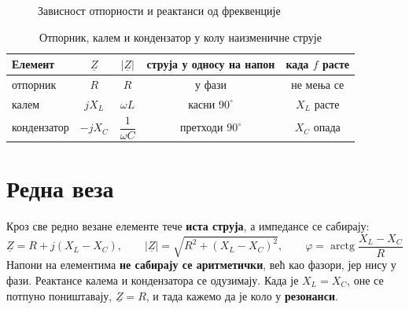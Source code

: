 \documentclass{article}
\begin{document}
\begin{figure}[H]
    \centering
    \caption{Зависност отпорности и реактанси од фреквенције}
    \label{fig:X-f}
\end{figure}

\begin{table}[H]
    \centering
    \renewcommand{\arraystretch}{1.7}
    \begin{tabular}{lcccc}
        \toprule
        Елемент     & $\underline{Z}$ & $|\underline{Z}|$ & струја у односу на напон & када $f$ расте \\
        \midrule
        отпорник    & $R$     & $R$                     & у фази               & не мења се \\
        калем       & $jX_L$  & $\omega L$              & касни $90^\circ$     & $X_L$ расте \\
        кондензатор & $-jX_C$ & $\dfrac{1}{\omega C}$   & претходи $90^\circ$  & $X_C$ опада \\
        \bottomrule
    \end{tabular}
    \caption{Отпорник, калем и кондензатор у колу наизменичне струје}
    \label{tab:rlc-ac}
\end{table}

\section{Редна веза}

Кроз све редно везане елементе тече \textbf{иста струја}, а импедансе се
сабирају:
\[
\underline{Z} = R + j(X_L - X_C), \qquad
|\underline{Z}| = \sqrt{R^2 + (X_L - X_C)^2}, \qquad
\varphi = \operatorname{arctg}\frac{X_L - X_C}{R}
\]
Напони на елементима \textbf{не сабирају се аритметички}, већ као фазори, јер
нису у фази. Реактансе калема и кондензатора се одузимају. Када је
$X_L = X_C$, оне се потпуно поништавају, $\underline{Z} = R$, и тада кажемо
да је коло у \textbf{резонанси}.
\end{document}
